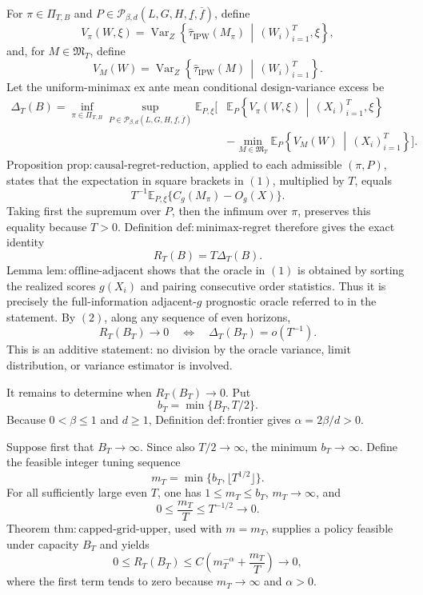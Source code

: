 For \(\pi\in\Pi_{T,B}\) and \(P\in\mathcal P_{\beta,d}(L,G,H,\underline f,\overline f)\), define
\[
V_\pi(W,\xi)
=\operatorname{Var}_Z\!\left\{
\widehat\tau_{\mathrm{IPW}}(M_\pi)
\,\middle|\,(W_i)_{i=1}^T,\xi
\right\},
\]
and, for \(M\in\mathfrak M_T\), define
\[
V_M(W)
=\operatorname{Var}_Z\!\left\{
\widehat\tau_{\mathrm{IPW}}(M)
\,\middle|\,(W_i)_{i=1}^T
\right\}.
\]
Let the uniform-minimax ex ante mean conditional design-variance excess be
\[
\begin{split}
\Delta_T(B)
=\inf_{\pi\in\Pi_{T,B}}
\sup_{P\in\mathcal P_{\beta,d}(L,G,H,\underline f,\overline f)}
\mathbb E_{P,\xi}\!\Bigg[&
\mathbb E_P\!\left\{V_\pi(W,\xi)\,\middle|\,(X_i)_{i=1}^T,\xi\right\}\\
&-\min_{M\in\mathfrak M_T}
\mathbb E_P\!\left\{V_M(W)\,\middle|\,(X_i)_{i=1}^T\right\}
\Bigg].
\end{split}
\tag{1}
\]
Proposition \(\mathrm{prop:causal\text{-}regret\text{-}reduction}\), applied to each admissible \((\pi,P)\), states that the expectation in square brackets in \((1)\), multiplied by \(T\), equals
\[
T^{-1}\mathbb E_{P,\xi}\{C_g(M_\pi)-O_g(X)\}.
\]
Taking first the supremum over \(P\), then the infimum over \(\pi\), preserves this equality because \(T>0\).  Definition \(\mathrm{def:minimax\text{-}regret}\) therefore gives the exact identity
\[
R_T(B)=T\Delta_T(B).
\tag{2}
\]
Lemma \(\mathrm{lem:offline\text{-}adjacent}\) shows that the oracle in \((1)\) is obtained by sorting the realized scores \(g(X_i)\) and pairing consecutive order statistics.  Thus it is precisely the full-information adjacent-\(g\) prognostic oracle referred to in the statement.  By \((2)\), along any sequence of even horizons,
\[
R_T(B_T)\longrightarrow0
\quad\Longleftrightarrow\quad
\Delta_T(B_T)=o(T^{-1}).
\tag{3}
\]
This is an additive statement: no division by the oracle variance, limit distribution, or variance estimator is involved.

It remains to determine when \(R_T(B_T)\to0\).  Put
\[
b_T=\min\{B_T,T/2\}.
\]
Because \(0<\beta\le1\) and \(d\ge1\), Definition \(\mathrm{def:frontier}\) gives \(\alpha=2\beta/d>0\).

Suppose first that \(B_T\to\infty\).  Since also \(T/2\to\infty\), the minimum \(b_T\to\infty\).  Define the feasible integer tuning sequence
\[
m_T=\min\{b_T,\lfloor T^{1/2}\rfloor\}.
\]
For all sufficiently large even \(T\), one has \(1\le m_T\le b_T\), \(m_T\to\infty\), and
\[
0\le \frac{m_T}{T}\le T^{-1/2}\longrightarrow0.
\]
Theorem \(\mathrm{thm:capped\text{-}grid\text{-}upper}\), used with \(m=m_T\), supplies a policy feasible under capacity \(B_T\) and yields
\[
0\le R_T(B_T)
\le C\left(m_T^{-\alpha}+\frac{m_T}{T}\right)
\longrightarrow0,
\tag{4}
\]
where the first term tends to zero because \(m_T\to\infty\) and \(\alpha>0\).


